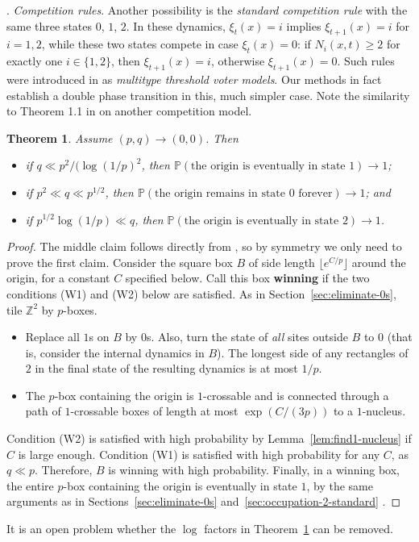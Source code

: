 \documentclass{article}
\renewcommand{\P}{\mathbb{P}}
\newcommand{\bZ}{{\mathbb Z}}
\numberwithin{equation}{section}
\newtheorem{theorem}{Theorem}[section]
\begin{document}

 \bigskip
 
. {\it Competition rules\/}.
Another possibility is the {\it standard competition rule\/} with the same 
three states $0$, $1$, $2$. In these dynamics,  
$\xi_t(x)=i$ implies $\xi_{t+1}(x)=i$  for 
$i=1,2$, while these two states compete
in case $\xi_t(x)=0$: if $N_i(x,t)\ge 2$
for exactly one $i\in\{1,2\}$, then $\xi_{t+1}(x)=i$, otherwise 
$\xi_{t+1}(x)=0$. 
Such rules were 
introduced in \cite{Gravner1997} as {\it multitype threshold voter models\/}. 
Our methods in fact establish a double phase transition in this, much simpler case. Note the similarity to Theorem 1.1 in \cite{GS24} on another 
competition model.
\begin{theorem}\label{thm:competition}
Assume $(p,q)\to (0,0)$. Then 
\begin{itemize}
\item if $q\ll p^{2}/(\log(1/p)^2$, then $\P(\text{the origin is eventually in state $1$})\to 1$;
\item if $p^2\ll q\ll p^{1/2}$, then $\P(\text{the origin  remains in state $0$ forever})\to 1$; and 
\item if $p^{1/2}\log(1/p)\ll q$, then $\P(\text{the origin is eventually in state $2$})\to 1$.
\end{itemize}
\end{theorem}
\begin{proof}
    The middle claim follows directly from \cite{GravnerMcDonald}, so by symmetry we only need to prove the first claim. Consider the 
    square box $B$ of side length $\lfloor e^{C/p}\rfloor$ around the origin, for a constant $C$ specified below. Call this box
    {\bf winning\/} if the two conditions (W1) and (W2) below are satisfied.  As in Section~\ref{sec:eliminate-0s}, tile $\bZ^2$ by $p$-boxes.

    \begin{itemize}[leftmargin=1cm]
        \item [(W1)]  Replace all $1$s on $B$ by $0$s. Also, turn the state of {\it all\/} 
        sites outside $B$ to $0$ (that is, consider the internal dynamics in $B$). The longest side of any rectangles of $2$ in the final state of the resulting dynamics is at most $1/p$. 
        \item [(W2)]  The $p$-box containing the origin is $1$-crossable and is connected through a 
        path of $1$-crossable boxes of length at most $\exp(C/(3p))$ 
        to a $1$-nucleus.   
    \end{itemize}
Condition (W2) is satisfied with high probability by Lemma~\ref{lem:find1-nucleus} if $C$ is large enough. Condition (W1) is satisfied with high probability for any $C$, as $q\ll p$. Therefore,  
    $B$ is winning with high probability. Finally, in a winning box, the entire $p$-box containing the origin is eventually in state $1$, by 
    the same arguments as in Sections~\ref{sec:eliminate-0s} and~\ref{sec:occupation-2-standard} .
\end{proof}
It is an open problem whether the $\log$ factors in Theorem~\ref{thm:competition} can be removed. 
\end{document}
